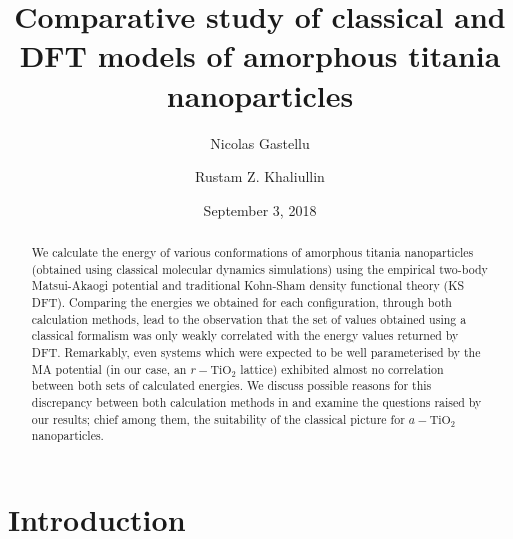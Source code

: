 \documentclass[aps,prb,twocolumn,amsmath,amssymb,superscriptaddress,longbibliography]{revtex4-1}
\begin{document}
\title{
Comparative study of classical and DFT models of amorphous titania nanoparticles
}

\author{Nicolas Gastellu}
\author{Rustam Z. Khaliullin}

\date{September 3, 2018}

\begin{abstract}

We calculate the energy of various conformations of amorphous titania nanoparticles (obtained using classical molecular dynamics simulations) using the empirical two-body Matsui-Akaogi potential and traditional Kohn-Sham density functional theory (KS DFT).
Comparing the energies we obtained for each configuration, through both calculation methods, lead to the observation that the set of values obtained using a classical formalism was only weakly correlated with the energy values returned by DFT.
Remarkably, even systems which were expected to be well parameterised  by the MA potential (in our case, an $r-\text{TiO}_2$ lattice) exhibited almost no correlation between both sets of calculated energies.
We discuss possible reasons for this discrepancy between both calculation methods in and examine the questions raised by our results; chief among them, the suitability of the classical picture for $a-\text{TiO}_2$ nanoparticles.

\end{abstract}

\maketitle
 

\section*{Introduction} 
\end{document}
